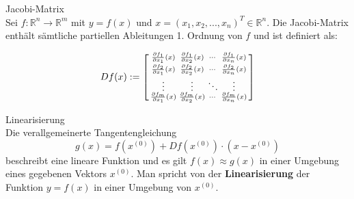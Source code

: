 \begin{definition}{Jacobi-Matrix}\\
Sei $f: \mathbb{R}^n \rightarrow \mathbb{R}^m$ mit $y = f(x)$ und $x = (x_1, x_2, ..., x_n)^T \in \mathbb{R}^n$. Die Jacobi-Matrix enthält sämtliche partiellen Ableitungen 1. Ordnung von $f$ und ist definiert als:

$$Df(x) := \begin{bsmallmatrix}
\frac{\partial f_1}{\partial x_1}(x) & \frac{\partial f_1}{\partial x_2}(x) & \cdots & \frac{\partial f_1}{\partial x_n}(x) \\
\frac{\partial f_2}{\partial x_1}(x) & \frac{\partial f_2}{\partial x_2}(x) & \cdots & \frac{\partial f_2}{\partial x_n}(x) \\
\vdots & \vdots & \ddots & \vdots \\
\frac{\partial f_m}{\partial x_1}(x) & \frac{\partial f_m}{\partial x_2}(x) & \cdots & \frac{\partial f_m}{\partial x_n}(x)
\end{bsmallmatrix}$$
\end{definition}

\begin{concept}{Linearisierung}\\
Die verallgemeinerte Tangentengleichung
$$g(x) = f(x^{(0)}) + Df(x^{(0)}) \cdot (x - x^{(0)})$$
beschreibt eine lineare Funktion und es gilt $f(x) \approx g(x)$ in einer Umgebung eines gegebenen Vektors $x^{(0)}$. Man spricht von der \textbf{Linearisierung} der Funktion $y = f(x)$ in einer Umgebung von $x^{(0)}$.
\end{concept}

